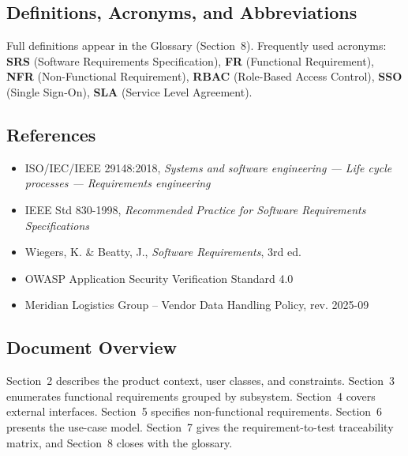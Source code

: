 \subsection{Definitions, Acronyms, and Abbreviations}
Full definitions appear in the Glossary (Section~8). Frequently used acronyms: \textbf{SRS}
(Software Requirements Specification), \textbf{FR} (Functional Requirement), \textbf{NFR}
(Non-Functional Requirement), \textbf{RBAC} (Role-Based Access Control), \textbf{SSO}
(Single Sign-On), \textbf{SLA} (Service Level Agreement).

\subsection{References}
\begin{itemize}[leftmargin=1.4em]
  \item ISO/IEC/IEEE 29148:2018, \textit{Systems and software engineering --- Life cycle
        processes --- Requirements engineering} \cite{ieee29148}
  \item IEEE Std 830-1998, \textit{Recommended Practice for Software Requirements
        Specifications} \cite{ieee830}
  \item Wiegers, K. \& Beatty, J., \textit{Software Requirements}, 3rd ed. \cite{wiegers2013}
  \item OWASP Application Security Verification Standard 4.0 \cite{owaspasvs}
  \item Meridian Logistics Group -- Vendor Data Handling Policy, rev. 2025-09
\end{itemize}

\subsection{Document Overview}
Section~2 describes the product context, user classes, and constraints. Section~3 enumerates
functional requirements grouped by subsystem. Section~4 covers external interfaces. Section~5
specifies non-functional requirements. Section~6 presents the use-case model. Section~7 gives
the requirement-to-test traceability matrix, and Section~8 closes with the glossary.
